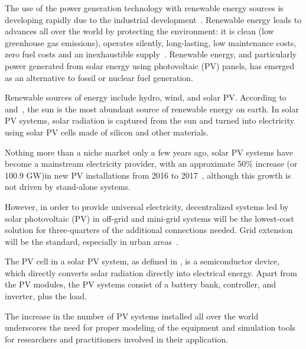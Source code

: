 The use of the power generation technology with renewable energy sources is developing rapidly due to the industrial development~\cite{Yatimi}. Renewable energy leads to advances all over the world by protecting the environment: it is clean (low greenhouse gas emissions), operates silently, long-lasting, low maintenance costs, zero fuel costs and an  inexhaustible supply~\cite{Noroozian}. Renewable energy, and particularly power generated from solar energy using photovoltaic (PV) panels, has emerged as an alternative to fossil or nuclear fuel generation. 

Renewable sources of energy include hydro, wind, and solar PV. According to~\cite{SEIA} and~\cite{Chauhan}, the sun is the most abundant source of renewable energy on earth. In solar PV systems, solar radiation is captured from the sun and turned into electricity using solar PV cells made of silicon and other materials.

Nothing more than a niche market only a few years ago, solar PV systems have become a mainstream electricity provider, with an  approximate 50\% increase (or 100.9 GW)in new PV installations from 2016 to 2017~\cite{EPIA}, although this growth is not driven by stand-alone systems.

However, in order to provide universal electricity, decentralized systems led by solar photovoltaic (PV) in off-grid and mini-grid systems will be the lowest-cost solution for three-quarters of the additional connections needed. Grid extension will be the standard, especially in urban areas~\cite{IEAweo2018}.

The PV cell in a solar PV system, as defined in \cite{Rawat}, is a semiconductor device, which directly converts solar radiation directly into electrical energy. Apart from the PV modules, the PV systems consist of a battery bank, controller, and inverter, plus the load.
%
%

The increase in the number of PV systems installed all over the world underscores the need for proper modeling of the equipment and simulation tools for researchers and practitioners involved in their application. 

